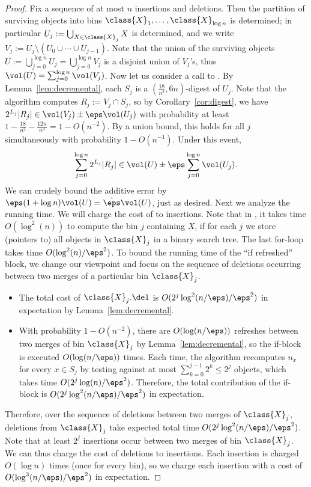 \begin{proof}
    Fix a sequence of at most $n$ insertions and deletions. Then the partition of surviving objects into bins $\class{X}_1, \dots, \class{X}_{\log n}$ is determined; in particular $U_j := \bigcup_{X \in \class{X}_j} X$ is determined, and we write $V_j := U_j \setminus (U_0 \cup \cdots \cup U_{j-1})$. Note that the union of the surviving objects $U := \bigcup_{j=0}^{\log n} U_j = \bigcup_{j=0}^{\log n} V_j$ is a disjoint union of $V_j$'s, thus $\vol(U) = \sum_{j=0}^{\log n} \vol(V_j)$.
%
    Now let us consider a call to \est. By Lemma~\ref{lem:decremental}, each $S_j$ is a $(\frac{18}{n^2}, 6n)$-digest of $U_j$. Note that the algorithm computes $R_j := V_j \cap S_j$, so by Corollary~\ref{cor:digest}, we have $2^{L_j} |R_j| \in \vol(V_j) \pm \eps \vol(U_j)$ with probability at least $1 - \frac{18}{n^2} - \frac{12n}{n^4} = 1 - O(n^{-2})$. By a union bound, this holds for all $j$ simultaneously with probability $1 - O(n^{-1})$. Under this event,
    \[ \sum_{j=0}^{\log n} 2^{L_j}|R_j| \in \vol(U) \pm \eps \sum_{j=0}^{\log n} \vol(U_j). \]
    We can crudely bound the additive error by $\eps (1+\log n)\vol(U) = \hat \eps \vol(U)$, just as desired.
%
    Next we analyze the running time. We will charge the cost of \del to insertions. Note that in \del, it takes time $O(\log^2(n))$ to compute the bin $j$ containing $X$, if for each $j$ we store (pointers to) all objects in $\class{X}_j$ in a binary search tree. The last for-loop takes time $O(\log^2(n) / \eps^2)$. To bound the running time of the ``if refreshed'' block, we change our viewpoint and focus on the sequence of deletions occurring between two merges of a particular bin $\class{X}_j$.
    \begin{itemize}
        \item The total cost of $\class{X}_j.\del$ is $O(2^j \log^2(n/\eps) / \eps^2)$ in expectation by Lemma~\ref{lem:decremental}.  
        \item With probability $1 - O(n^{-2})$, there are $O(\log(n/\eps))$ refreshes between two merges of bin $\class{X}_j$ by Lemma~\ref{lem:decremental}, so the if-block is executed $O(\log(n/\eps))$ times. Each time, the algorithm recomputes $n_x$ for every $x \in S_j$ by testing against at most $\sum_{k = 0}^{j-1} 2^k \leq 2^j$ objects, which takes time $O(2^j \log(n) / \eps^2)$. Therefore, the total contribution of the if-block is $O(2^j \log^2(n/\eps) / \eps^2)$ in expectation.
    \end{itemize}
    Therefore, over the sequence of deletions between two merges of $\class{X}_j$, deletions from $\class{X}_j$ take expected total time $O(2^j \log^2(n/\eps) / \eps^2)$. Note that at least $2^j$ insertions occur between two merges of bin $\class{X}_j$. We can thus charge the cost of deletions to insertions. Each insertion is charged $O(\log n)$ times (once for every bin), so we charge each insertion with a cost of $O(\log^3(n/\eps) / \eps^2)$ in expectation.

\end{proof}
